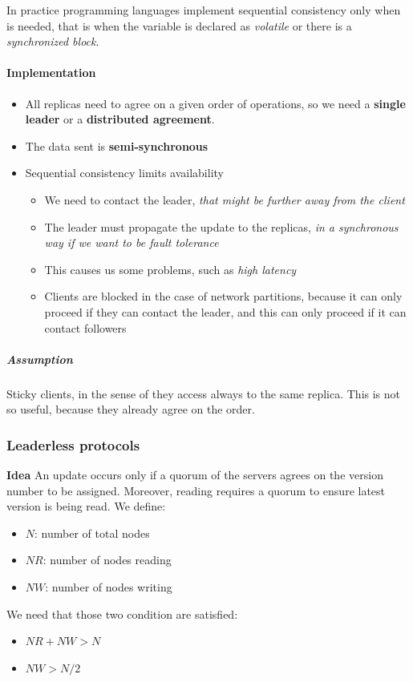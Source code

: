 In practice programming languages implement sequential consistency only
when is needed, that is when the variable is declared as \emph{volatile}
or there is a \emph{synchronized block}.\\
\paragraph{Implementation}

\begin{itemize}
    \item
      All replicas need to agree on a given order of operations, so we need
      a \textbf{single leader} or a \textbf{distributed agreement}.
    \item
      The data sent is \textbf{semi-synchronous}
      
    \item
      Sequential consistency limits availability
    \begin{itemize}
        \item
          We need to contact the leader, \emph{that might be further away from
          the client}
        \item
          The leader must propagate the update to the replicas, \emph{in a
          synchronous way if we want to be fault tolerance}
        \item
          This causes us some problems, such as \emph{high latency}
        \item
          Clients are blocked in the case of network partitions, because it can
          only proceed if they can contact the leader, and this can only proceed
          if it can contact followers
    \end{itemize}
\end{itemize}

\subparagraph{Assumption}
Sticky clients, in the sense of they access always to the same
replica. This is not so useful, because they already agree on the
order.

\subsubsection{Leaderless protocols}

\textbf{Idea} An update occurs only if a quorum of the servers agrees on
the version number to be assigned.
Moreover, reading requires a quorum to ensure latest version is being
read.
We define:
\begin{itemize}
    \item
      $N$: number of total nodes
    \item
      $NR$: number of nodes reading
    \item
      $NW$: number of nodes writing
\end{itemize}
We need that those two condition are satisfied:
\begin{itemize}
    \item
      $NR + NW \gt N$
    \item
      $NW \gt N/2$
\end{itemize}

